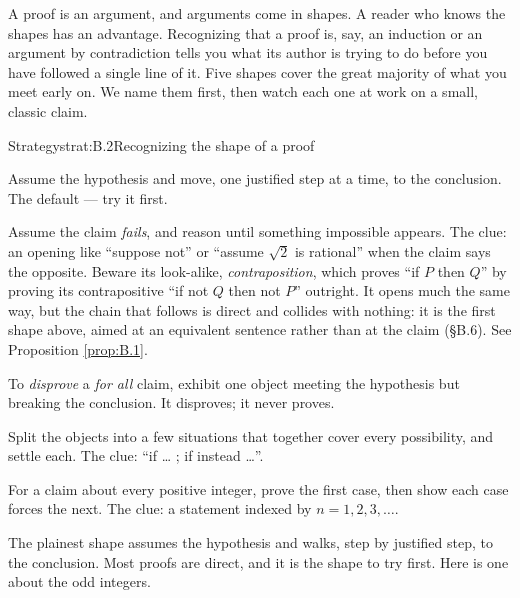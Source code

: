 \documentclass[a4paper,12pt,oneside]{memoir}
\begin{document}
A proof is an argument, and arguments come in shapes. A reader who knows the shapes has an advantage. Recognizing that a proof is, say, an induction or an argument by contradiction tells you what its author is trying to do before you have followed a single line of it. Five shapes cover the great majority of what you meet early on. We name them first, then watch each one at work on a small, classic claim.

\begin{envstrategy}{Strategy}{strat:B.2}{Recognizing the shape of a proof}
\begin{bulletsteps}
  \item {} Assume the hypothesis and move, one justified step at a time, to the conclusion. The default — try it first.
  \item {} Assume the claim \emph{fails}, and reason until something impossible appears. The clue: an opening like “suppose not” or “assume \(\sqrt{2}\) is rational” when the claim says the opposite. Beware its look-alike, \emph{contraposition}, which proves “if \(P\) then \(Q\)” by proving its contrapositive “if not \(Q\) then not \(P\)” outright. It opens much the same way, but the chain that follows is direct and collides with nothing: it is the first shape above, aimed at an equivalent sentence rather than at the claim (§B.6). See Proposition \ref{prop:B.1}.
  \item {} To \emph{disprove} a \emph{for all} claim, exhibit one object meeting the hypothesis but breaking the conclusion. It disproves; it never proves.
  \item {} Split the objects into a few situations that together cover every possibility, and settle each. The clue: “if … ; if instead …”.
  \item {} For a claim about every positive integer, prove the first case, then show each case forces the next. The clue: a statement indexed by \(n = 1, 2, 3, \ldots\).
\end{bulletsteps}
\end{envstrategy}
 The plainest shape assumes the hypothesis and walks, step by justified step, to the conclusion. Most proofs are direct, and it is the shape to try first. Here is one about the odd integers.
\end{document}
